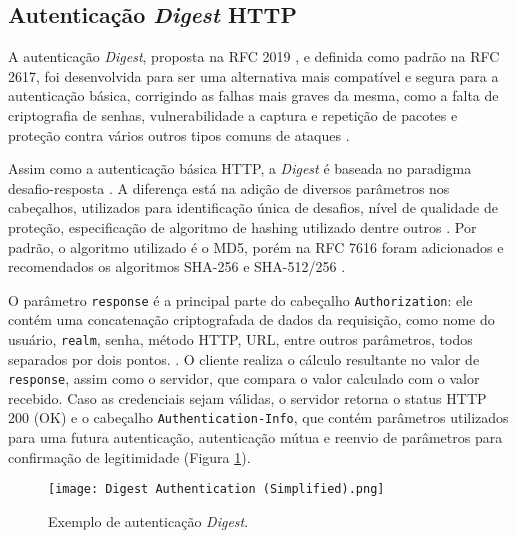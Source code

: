 \subsection{Autenticação \emph{Digest} HTTP}

A autenticação \emph{Digest}, proposta na RFC 2019 \cite{RFC2019}, e definida como padrão na RFC 
2617, foi desenvolvida para ser uma alternativa mais compatível e segura para a autenticação básica, 
corrigindo as falhas mais graves da mesma, como a falta de criptografia de senhas, vulnerabilidade a 
captura e repetição de pacotes e proteção contra vários outros tipos comuns de ataques 
\cite{GOURLEY2002}.

Assim como a autenticação básica HTTP, a \emph{Digest} é baseada no paradigma 
desafio-resposta \cite{RFC7616}. A diferença está na adição de diversos parâmetros nos 
cabeçalhos, utilizados para identificação única de desafios, nível de qualidade de proteção, 
especificação de algoritmo de hashing utilizado dentre outros \cite{CHAPMAN2012}. Por padrão, 
o algoritmo utilizado é o MD5, porém na RFC 7616 foram adicionados e recomendados os algoritmos 
SHA-256 e SHA-512/256 \cite{RFC7616}.

O parâmetro \texttt{response} é a principal parte do cabeçalho \texttt{Authorization}: ele contém 
uma concatenação criptografada de dados da requisição, como nome do usuário, \texttt{realm}, senha, 
método HTTP, URL, entre outros parâmetros, todos separados por dois pontos. \cite{CHAPMAN2012}. O 
cliente realiza o cálculo resultante no valor de \texttt{response}, assim como o servidor, que 
compara o valor calculado com o valor recebido. Caso as credenciais sejam válidas, o servidor retorna
o status HTTP 200 (OK) e o cabeçalho \texttt{Authentication-Info}, que contém parâmetros utilizados 
para uma futura autenticação, autenticação mútua e reenvio de parâmetros para confirmação de 
legitimidade (Figura \ref{fig:digestAuth}).

\begin{figure}[ht]
  \centering
  \texttt{[image: Digest Authentication (Simplified).png]}
  \caption{Exemplo de autenticação \emph{Digest}.}
  \label{fig:digestAuth}
\end{figure}